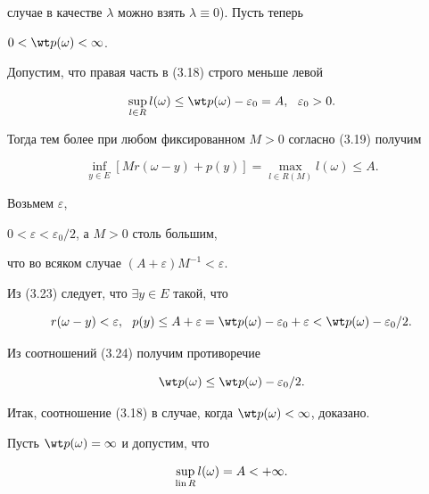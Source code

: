 \begin{pf}
случае в качестве $\lambda$ можно взять $\lambda\equiv0$). Пусть теперь 


$0<\wt p(\omega)<\infty$. 


Допустим, что правая часть в (3.18) строго меньше левой 


\begin{equation} 


\sup_{l\in R}l(\omega)\le\wt p(\omega)-\varepsilon_0=A, 


\ \ \varepsilon_0>0. 


\end{equation} 


Тогда тем более при любом фиксированном $M>0$ согласно (3.19) получим 


\begin{equation} 


\inf_{y\in E}[M r(\omega-y)+p(y)]= 


\max_{l\in R(M)}l(\omega)\le A. 


\end{equation} 


Возьмем $\varepsilon$,


$0<\varepsilon<\varepsilon_0/2$, а $M>0$ столь большим, 


что во всяком случае $(A+\varepsilon)M^{-1}<\varepsilon$. 


Из (3.23) следует, что $\exists y\in E$ такой, что 


\begin{equation} 


r(\omega-y)<\varepsilon,\ \ p(y)\le A+\varepsilon= 


\wt p(\omega)-\varepsilon_0+\varepsilon<\wt p(\omega)- 


\varepsilon_0/2. 


\end{equation} 


Из соотношений (3.24) получим противоречие 


$$ 


\wt p(\omega)\le\wt p(\omega)-\varepsilon_0/2. 


$$ 


Итак, соотношение (3.18) в случае, когда $\wt p(\omega)<\infty$, доказано. 


Пусть $\wt p(\omega)=\infty$ и допустим, что 


\begin{equation} 


\sup_{\lin R}l(\omega)=A<+\infty. 


\end{equation} 



\end{pf}
